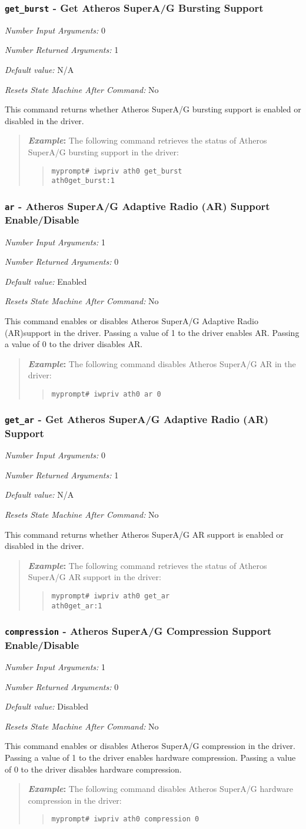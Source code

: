 \documentclass[10pt,fullpage]{article}
\newcommand{\mytt}[1]{{\texttt{#1}}}
\newcommand{\bv}{\begin{verse}}
\newcommand{\ev}{\end{verse}}
\newcommand{\cmd}[1]{{\texttt{myprompt\# #1}}}
\newcommand{\argdesc}[4]{\begin{description}
\itemsep -6pt
\item \textit{Number Input Arguments:} #1
\item \textit{Number Returned Arguments:} #2
\item \textit{Default value:} #3
\item \textit{Resets State Machine After Command:} #4
\end{description}
}
\newenvironment{example}{\begin{quote}\textbf{\textit{Example}:}}{\end{quote}}
\begin{document}
\subsubsection{\mytt{get\_burst} - Get Atheros SuperA/G Bursting
  Support}
\argdesc{0}{1}{N/A}{No}
This command returns whether Atheros SuperA/G bursting support is enabled or disabled
in the driver.
\begin{example}
The following command retrieves the status of Atheros SuperA/G bursting support in
the driver:
\bv
\cmd{iwpriv ath0 get\_burst}\\
\mytt{ath0\hspace{32pt}get\_burst:1}
\ev
\end{example}

\subsubsection{\mytt{ar} - Atheros SuperA/G Adaptive Radio (AR) Support Enable/Disable}
\argdesc{1}{0}{Enabled}{No}
This command enables or disables Atheros SuperA/G Adaptive Radio
(AR)support in the driver.  Passing a value of 1 to the driver enables
AR. Passing a value of 0 to the driver disables AR.
\begin{example}
The following command disables Atheros SuperA/G AR in the driver:
\bv
\cmd{iwpriv ath0 ar 0}
\ev
\end{example}

\subsubsection{\mytt{get\_ar} - Get Atheros SuperA/G Adaptive Radio
  (AR) Support}
\argdesc{0}{1}{N/A}{No}
This command returns whether Atheros SuperA/G AR support is enabled or disabled
in the driver.
\begin{example}
The following command retrieves the status of Atheros SuperA/G AR support in
the driver:
\bv
\cmd{iwpriv ath0 get\_ar}\\
\mytt{ath0\hspace{32pt}get\_ar:1}
\ev
\end{example}

\subsubsection{\mytt{compression} - Atheros SuperA/G Compression Support Enable/Disable}
\argdesc{1}{0}{Disabled}{No}
This command enables or disables Atheros SuperA/G compression in the
driver.  Passing a value of 1 to the driver enables hardware
compression. Passing a value of 0 to the driver disables hardware
compression.
\begin{example}
The following command disables Atheros SuperA/G hardware compression in the driver:
\bv
\cmd{iwpriv ath0 compression 0}
\ev
\end{example}
\end{document}

